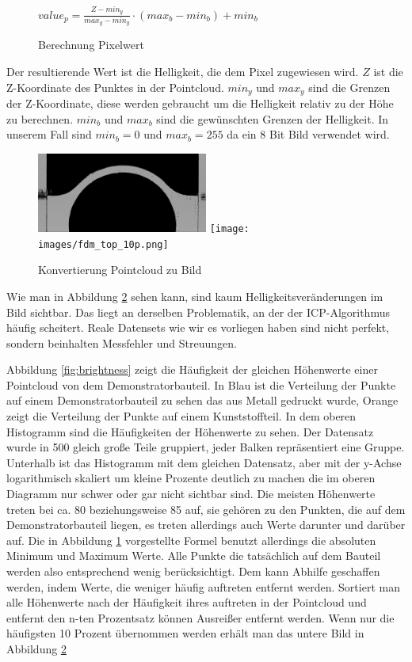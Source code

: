 \documentclass[../main.tex]{subfiles}
\begin{document}
\begin{figure}
    \centering
    $value_p = \frac{Z - min_y}{max_y - min_y} \cdot (max_b - min_b) + min_b$
    \caption{Berechnung Pixelwert}
    \label{calc:brightness}
\end{figure}
Der resultierende Wert ist die Helligkeit, die dem Pixel zugewiesen wird.
$Z$ ist die Z-Koordinate des Punktes in der Pointcloud. $min_y$ und $max_y$ sind 
die Grenzen der Z-Koordinate, diese werden gebraucht um die Helligkeit relativ 
zu der Höhe zu berechnen. $min_b$ und $max_b$ sind die gewünschten Grenzen der 
Helligkeit. In unserem Fall sind $min_b = 0$ und $max_b = 255$ da ein 8 Bit Bild
verwendet wird.

\begin{figure}
    \centering
    \includegraphics[width=0.5\textwidth]{images/fdm_top_100p.png}
    \texttt{[image: images/fdm\_top\_10p.png]}
    \caption{Konvertierung Pointcloud zu Bild}
    \label{fig:image_from_pc}
\end{figure}

Wie man in Abbildung \ref{fig:image_from_pc} sehen kann, sind kaum Helligkeitsveränderungen
im Bild sichtbar. Das liegt an derselben Problematik, an der der ICP-Algorithmus häufig
scheitert. Reale Datensets wie wir es vorliegen haben sind nicht perfekt, sondern
beinhalten Messfehler und Streuungen. 

Abbildung \ref*{fig:brightness} zeigt die Häufigkeit der gleichen Höhenwerte einer
Pointcloud von dem Demonstratorbauteil. In Blau ist die Verteilung der Punkte auf 
einem Demonstratorbauteil zu sehen das aus Metall gedruckt wurde, Orange zeigt die 
Verteilung der Punkte auf einem Kunststoffteil.
In dem oberen Histogramm 
sind die Häufigkeiten der Höhenwerte zu sehen. Der Datensatz wurde in 500 gleich große
Teile gruppiert, jeder Balken repräsentiert eine Gruppe.
Unterhalb ist das Histogramm mit dem gleichen Datensatz, aber mit der y-Achse 
logarithmisch skaliert um kleine Prozente deutlich zu machen die im
oberen Diagramm nur schwer oder gar nicht sichtbar sind. 
Die meisten Höhenwerte treten bei ca. 80 beziehungsweise 85 auf, 
sie gehören zu den Punkten, die auf dem Demonstratorbauteil liegen, 
es treten allerdings auch Werte darunter und darüber auf. 
Die in Abbildung \ref*{calc:brightness} vorgestellte Formel benutzt allerdings 
die absoluten Minimum und Maximum Werte.
Alle Punkte die tatsächlich auf dem Bauteil werden also entsprechend wenig
berücksichtigt. Dem kann Abhilfe geschaffen werden, indem Werte, die weniger häufig 
auftreten entfernt werden. Sortiert man alle Höhenwerte nach der Häufigkeit ihres 
auftreten in der Pointcloud und entfernt den n-ten Prozentsatz können Ausreißer 
entfernt werden. Wenn nur die häufigsten 10 Prozent übernommen werden erhält man 
das untere Bild in Abbildung \ref{fig:image_from_pc}
\end{document}
